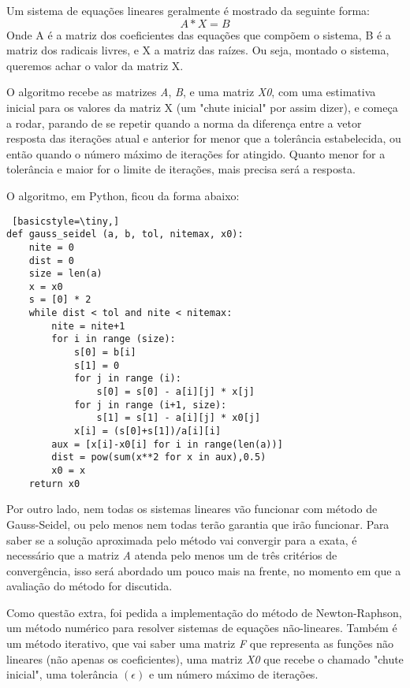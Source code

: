 \documentclass[12pt,A4]{report}
\begin{document}
Um sistema de equações lineares geralmente é mostrado da seguinte forma:
\begin{equation}
    A * X = B
\end{equation}
Onde A é a matriz dos coeficientes das equações que compõem o sistema, B é a matriz dos radicais livres, e X a matriz das raízes. Ou seja, montado o sistema, queremos achar o valor da matriz X.

O algoritmo recebe as matrizes \textit{A}, \textit{B}, e uma matriz \textit{X0}, com uma estimativa inicial para os valores da matriz X (um "chute inicial" por assim dizer), e começa a rodar, parando de se repetir quando a norma da diferença entre a vetor resposta das iterações atual e anterior for menor que a tolerância estabelecida, ou então quando o número máximo de iterações for atingido. Quanto menor for a tolerância e maior for o limite de iterações, mais precisa será a resposta.

O algoritmo, em Python, ficou da forma abaixo:

\begin{lstlisting} [basicstyle=\tiny,]
def gauss_seidel (a, b, tol, nitemax, x0):
    nite = 0
    dist = 0
    size = len(a)
    x = x0
    s = [0] * 2
    while dist < tol and nite < nitemax:
        nite = nite+1
        for i in range (size):
            s[0] = b[i]
            s[1] = 0
            for j in range (i):
                s[0] = s[0] - a[i][j] * x[j]
            for j in range (i+1, size):
                s[1] = s[1] - a[i][j] * x0[j]  
            x[i] = (s[0]+s[1])/a[i][i]
        aux = [x[i]-x0[i] for i in range(len(a))]
        dist = pow(sum(x**2 for x in aux),0.5)
        x0 = x
    return x0
\end{lstlisting}

Por outro lado, nem todas os sistemas lineares vão funcionar com método de Gauss-Seidel, ou pelo menos nem todas terão garantia que irão funcionar. Para saber se a solução aproximada pelo método vai convergir para a exata, é necessário que a matriz \textit{A} atenda pelo menos um de três critérios de convergência, isso será abordado um pouco mais na frente, no momento em que a avaliação do método for discutida.

Como questão extra, foi pedida a implementação do método de Newton-Raphson, um método numérico para resolver sistemas de equações não-lineares. Também é um método iterativo, que vai saber uma matriz \textit{F} que representa as funções não lineares (não apenas os coeficientes), uma matriz \textit{X0} que recebe o chamado "chute inicial", uma tolerância $(\epsilon)$ e um número máximo de iterações.
\end{document}
